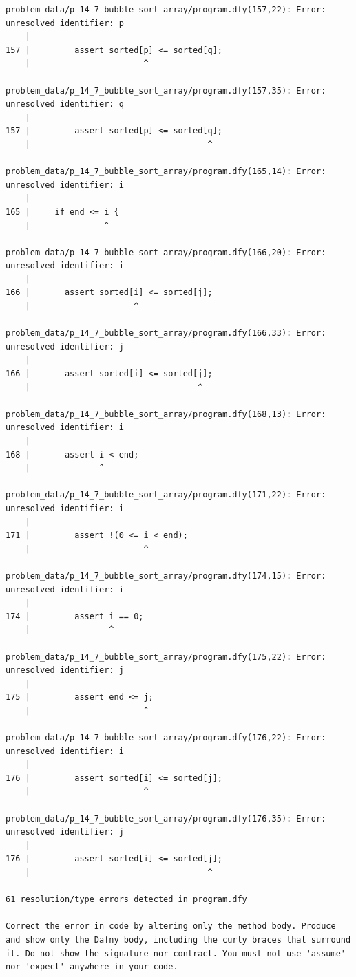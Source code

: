 \documentclass{article}
\begin{document}
\begin{lstlisting}
problem_data/p_14_7_bubble_sort_array/program.dfy(157,22): Error: unresolved identifier: p
    |
157 |         assert sorted[p] <= sorted[q];
    |                       ^

problem_data/p_14_7_bubble_sort_array/program.dfy(157,35): Error: unresolved identifier: q
    |
157 |         assert sorted[p] <= sorted[q];
    |                                    ^

problem_data/p_14_7_bubble_sort_array/program.dfy(165,14): Error: unresolved identifier: i
    |
165 |     if end <= i {
    |               ^

problem_data/p_14_7_bubble_sort_array/program.dfy(166,20): Error: unresolved identifier: i
    |
166 |       assert sorted[i] <= sorted[j];
    |                     ^

problem_data/p_14_7_bubble_sort_array/program.dfy(166,33): Error: unresolved identifier: j
    |
166 |       assert sorted[i] <= sorted[j];
    |                                  ^

problem_data/p_14_7_bubble_sort_array/program.dfy(168,13): Error: unresolved identifier: i
    |
168 |       assert i < end;
    |              ^

problem_data/p_14_7_bubble_sort_array/program.dfy(171,22): Error: unresolved identifier: i
    |
171 |         assert !(0 <= i < end);
    |                       ^

problem_data/p_14_7_bubble_sort_array/program.dfy(174,15): Error: unresolved identifier: i
    |
174 |         assert i == 0;
    |                ^

problem_data/p_14_7_bubble_sort_array/program.dfy(175,22): Error: unresolved identifier: j
    |
175 |         assert end <= j;
    |                       ^

problem_data/p_14_7_bubble_sort_array/program.dfy(176,22): Error: unresolved identifier: i
    |
176 |         assert sorted[i] <= sorted[j];
    |                       ^

problem_data/p_14_7_bubble_sort_array/program.dfy(176,35): Error: unresolved identifier: j
    |
176 |         assert sorted[i] <= sorted[j];
    |                                    ^

61 resolution/type errors detected in program.dfy

Correct the error in code by altering only the method body. Produce and show only the Dafny body, including the curly braces that surround it. Do not show the signature nor contract. You must not use 'assume' nor 'expect' anywhere in your code.
\end{lstlisting}
\end{document}
